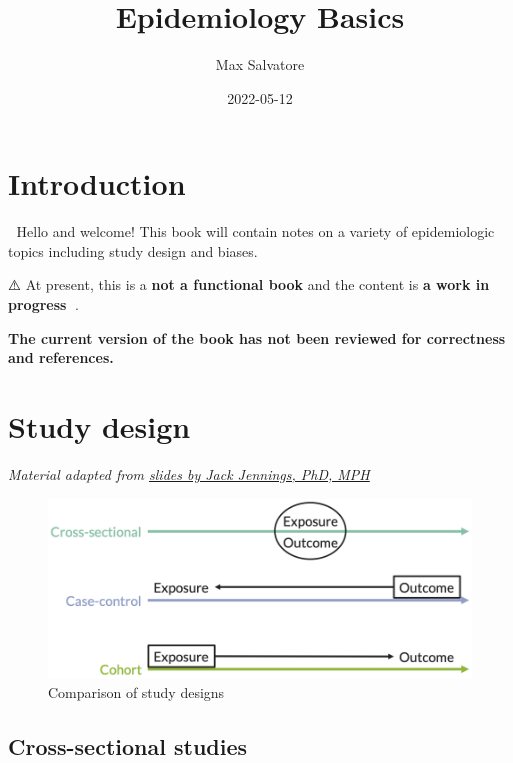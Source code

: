 \documentclass[
]{book}
\title{Epidemiology Basics}
\author{Max Salvatore}
\date{2022-05-12}
\begin{document}
\maketitle

{
\setcounter{tocdepth}{1}
\tableofcontents
}
\hypertarget{introduction}{%
\chapter{Introduction}\label{introduction}}

👋 Hello and welcome! This book will contain notes on a variety of epidemiologic topics including study design and biases.

⚠️ At present, this is a \textbf{not a functional book} and the content is \textbf{a work in progress} 🔧.

\textbf{The current version of the book has not been reviewed for correctness and references.}

\hypertarget{study-design}{%
\chapter{Study design}\label{study-design}}

\emph{Material adapted from \href{https://www.hopkinsmedicine.org/gynecology_obstetrics/pdfs/medstudent/rtc2014/Epi\%20Study\%20Design\%20and\%20Exploratory\%20Analyses_abb.pdf}{slides by Jack Jennings, PhD, MPH}}

\begin{figure}

{\centering \includegraphics[width=1\linewidth]{img/study_design/study_design_schematic} 

}

\caption{Comparison of study designs}\label{fig:unnamed-chunk-3}
\end{figure}

\hypertarget{cross-sectional-studies}{%
\section{Cross-sectional studies}\label{cross-sectional-studies}}
\end{document}
